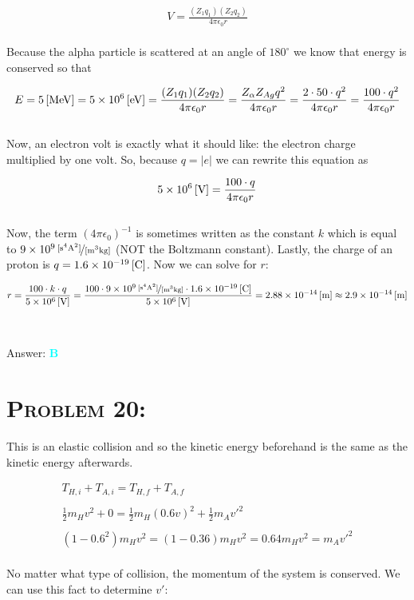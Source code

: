 \documentclass{article}
\providecommand{\e}[1]{\ensuremath{\times 10^{#1}}}
\begin{document}
\begin{gather}
V = \frac{(Z_{1}q_{1}) (Z_{2}q_{2})} {4 \pi \epsilon_{0} r}
\end{gather}
\\
Because the alpha particle is scattered at an angle of $180^{\circ}$ we know that energy is conserved so that 

\begin{gather}
E = \unit[5]{[MeV]}  = \unit[5\e{6}]{[eV]} = \frac{(Z_{1}q_{1}) (Z_{2}q_{2})} {4 \pi \epsilon_{0} r} = \frac{Z_{\alpha}Z_{Ag} q^{2}} {4 \pi \epsilon_{0} r} =  \frac{2 \cdot 50 \cdot q^{2}} {4 \pi \epsilon_{0} r} = \frac{100 \cdot q^{2}} {4 \pi \epsilon_{0} r}\nonumber
\end{gather}
\\
Now, an electron volt is exactly what it should like: the electron charge multiplied by one volt. So, because $q = |e|$ we can rewrite this equation as

\begin{gather}
\unit[5\e{6}]{[V]} = \frac{100 \cdot q} {4 \pi \epsilon_{0} r}\nonumber
\end{gather}
\\
Now, the term $(4 \pi \epsilon_{0})^{-1}$ is sometimes written as the constant $k$ which is equal to $\unitfrac[9\e{9}]{[s^{4} A^{2}]}{[m^{3} kg]}$ (NOT the Boltzmann constant). Lastly, the charge of an proton is $q =\unit[1.6\e{-19}]{[C]}$. Now we can solve for $r$:

\begin{gather}
r = \frac{100\cdot k \cdot q}{\unit[5\e{6}]{[V]}} =  \frac{100\cdot \unitfrac[9\e{9}]{[s^{4} A^{2}]}{[m^{3} kg]} \cdot \unit[1.6\e{-19}]{[C]}}{\unit[5\e{6}]{[V]}} = \unit[2.88\e{-14}]{[m]} \approx \unit[2.9\e{-14}]{[m]} \nonumber
\end{gather}
\\\\
Answer: \textbf{\textcolor{cyan}B}\\


\section{\textsc{Problem 20:}} This is an elastic collision and so the kinetic energy beforehand is the same as the kinetic energy afterwards.

\begin{gather}
T_{H,i} + T_{A, i} = T_{H,f} + T_{A, f}\nonumber\\
\nonumber\\
\frac{1}{2}m_{H} v^{2} + 0 = \frac{1}{2}m_{H} (0.6 v)^{2} + \frac{1}{2}m_{A} v'^{2}\nonumber\\
\nonumber\\
(1-0.6^{2})m_{H}v^{2} = (1-0.36)m_{H}v^{2} = 0.64 m_{H}v^{2} = m_{A} v'^{2}\nonumber
\end{gather}
\\
No matter what type of collision, the momentum of the system is conserved. We can use this fact to determine $v'$:
\end{document}

